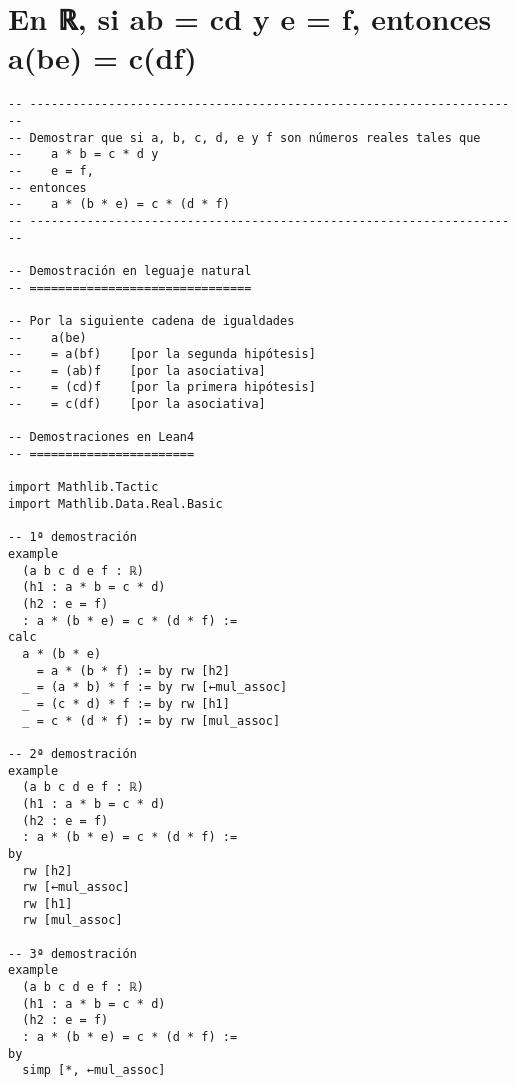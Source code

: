 \section{En ℝ, si ab = cd y e = f, entonces a(be) = c(df)}
\label{sec:org49426f4}
\begin{verbatim}
-- ---------------------------------------------------------------------
-- Demostrar que si a, b, c, d, e y f son números reales tales que
--    a * b = c * d y
--    e = f,
-- entonces
--    a * (b * e) = c * (d * f)
-- ---------------------------------------------------------------------

-- Demostración en leguaje natural
-- ===============================

-- Por la siguiente cadena de igualdades
--    a(be)
--    = a(bf)    [por la segunda hipótesis]
--    = (ab)f    [por la asociativa]
--    = (cd)f    [por la primera hipótesis]
--    = c(df)    [por la asociativa]

-- Demostraciones en Lean4
-- =======================

import Mathlib.Tactic
import Mathlib.Data.Real.Basic

-- 1ª demostración
example
  (a b c d e f : ℝ)
  (h1 : a * b = c * d)
  (h2 : e = f)
  : a * (b * e) = c * (d * f) :=
calc
  a * (b * e)
    = a * (b * f) := by rw [h2]
  _ = (a * b) * f := by rw [←mul_assoc]
  _ = (c * d) * f := by rw [h1]
  _ = c * (d * f) := by rw [mul_assoc]

-- 2ª demostración
example
  (a b c d e f : ℝ)
  (h1 : a * b = c * d)
  (h2 : e = f)
  : a * (b * e) = c * (d * f) :=
by
  rw [h2]
  rw [←mul_assoc]
  rw [h1]
  rw [mul_assoc]

-- 3ª demostración
example
  (a b c d e f : ℝ)
  (h1 : a * b = c * d)
  (h2 : e = f)
  : a * (b * e) = c * (d * f) :=
by
  simp [*, ←mul_assoc]
\end{verbatim}

